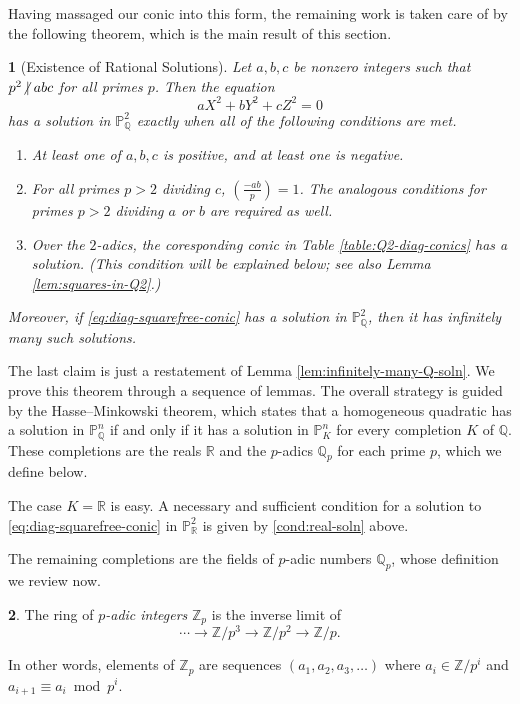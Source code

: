 \documentclass[10pt,a4paper]{amsart}
\numberwithin{equation}{section}
\numberwithin{figure}{section}
\numberwithin{table}{section}
\theoremstyle{definition}
\theoremstyle{plain}
\newtheorem{thm}{\protect\theoremname}[section]
\theoremstyle{remark}
\theoremstyle{plain}
\theoremstyle{definition}
\newtheorem{defn}[thm]{\protect\definitionname}
\theoremstyle{plain}
\theoremstyle{plain}
\providecommand{\definitionname}{Definition}
\providecommand{\theoremname}{Theorem}
\newcommand{\legendre}[2]{\genfrac{(}{)}{}{}{#1}{#2}}
\renewcommand{\P}{\mathbb{P}}
\newcommand{\Z}{\mathbb{Z}}
\newcommand{\Q}{\mathbb{Q}}
\newcommand{\R}{\mathbb{R}}
\newcommand{\ndiv}{\centernot|}
\begin{document}
	Having massaged our conic into this form, the remaining work is taken care of by the following theorem, which is the main result of this section.
	\begin{thm}[Existence of Rational Solutions]\label{thm:rational-solutions}
		Let $a,b,c$ be nonzero integers such that $p^2 \ndiv abc$ for all primes $p$. Then the equation
		\begin{equation}\label{eq:diag-squarefree-conic}
		aX^2 + bY^2 + cZ^2 = 0
		\end{equation}
		has a solution in $\P^2_\Q$ exactly when all of the following conditions are met.
		\begin{enumerate}
			\item\label{cond:real-soln} At least one of $a,b,c$ is positive, and at least one is negative.
			\item\label{cond:Qp-soln} For all primes $p>2$ dividing $c$, $\legendre{-ab}{p} = 1$. The analogous conditions for primes $p>2$ dividing $a$ or $b$ are required as well.
			\item\label{cond:Q2-soln} Over the $2$-adics, the coresponding conic in Table \ref{table:Q2-diag-conics} has a solution. (This condition will be explained below; see also Lemma 
			\ref{lem:squares-in-Q2}.)
		\end{enumerate}
		Moreover, if \eqref{eq:diag-squarefree-conic} has a solution in $\P^2_\Q$, then it has infinitely many such solutions.
	\end{thm}
	The last claim is just a restatement of Lemma \ref{lem:infinitely-many-Q-soln}.
	We prove this theorem through a sequence of lemmas. The overall strategy is guided by the Hasse--Minkowski theorem, which states that a homogeneous quadratic has a solution in $\P^n_\Q$ if and only if it has a solution in $\P^n_K$ for every completion $K$ of $\Q$. These completions are the reals $\R$ and the $p$-adics $\Q_p$ for each prime $p$, which we define below.
	
	The case $K=\R$ is easy. A necessary and sufficient condition for a solution 
	to \eqref{eq:diag-squarefree-conic} in $\P^2_\R$ is given by 
	\eqref{cond:real-soln} above.
	
	The remaining completions are the fields of $p$-adic numbers $\Q_p$, whose definition 
	we review now.
	\begin{defn}
		The ring of \emph{$p$-adic integers} $\Z_p$ is the inverse limit of
		\[
		\cdots \to \Z/p^3 \to \Z/p^2 \to \Z/p.
		\]
	\end{defn}
	In other words, elements of $\Z_p$ are sequences $(a_1,a_2,a_3,\ldots)$ where $a_i \in \Z/p^i$ and $a_{i+1} \equiv a_i\bmod {p^i}$.
	
\end{document}
